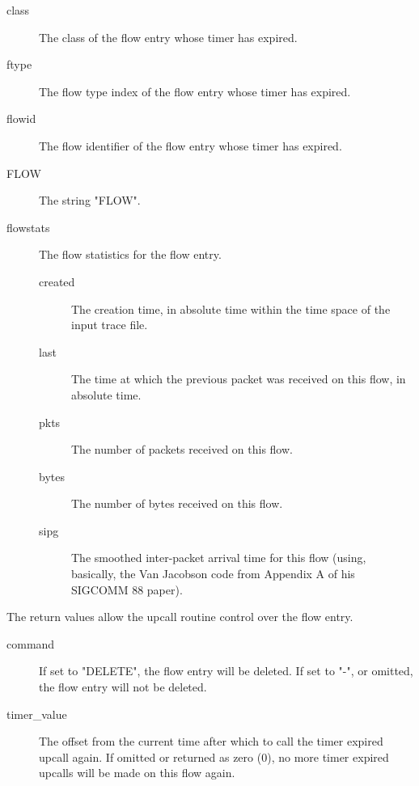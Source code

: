 \documentclass{article}
\begin{document}
\begin{description}
\item[class] The class of the flow entry whose timer has expired.
\item[ftype] The flow type index of the flow entry whose timer has
expired.
\item[flowid] The flow identifier of the flow entry whose timer has
expired.
\item[FLOW] The string "FLOW".
\item[flowstats] The flow statistics for the flow entry.
\begin{description}
\item[created] The creation time, in absolute time within the time
space of the input trace file.
\item[last] The time at which the previous packet was received on this
flow, in absolute time.
\item[pkts] The number of packets received on this flow.
\item[bytes] The number of bytes received on this flow.
\item[sipg] The smoothed inter-packet arrival time for this flow
(using, basically,
the Van Jacobson code from Appendix A of his SIGCOMM 88 paper).
\end{description}
\end{description}

The return values allow the upcall routine control over the flow entry.

\begin{description}
\item[command] If set to "DELETE", the flow entry will be deleted.  If
set to "-", or omitted, the flow entry will not be deleted.
\item[timer\_value] The offset from the current time after which to call
the timer expired upcall again.  If omitted or returned as zero (0), no
more timer expired upcalls will be made on this flow again.
\end{description}


\manend
\end{document}
